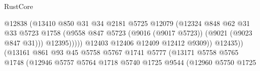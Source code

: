 \begin{lexlean}{RustCore}
\begin{coremodule}
                                                  @12838
                                                  (@13410
                                                    @850
                                                    @31
                                                    @34
                                                    @2181
                                                    @5725
                                                    @12079
                                                    (@12324
                                                      @848
                                                      @62
                                                      @31
                                                      @33
                                                      @5723
                                                      @1758
                                                      (@9558
                                                        @847
                                                        @5723
                                                        (@9016 (@9017 @5723))
                                                        (@9021 (@9023 @847 @31)))
                                                      @12395)))))
                                            @12403
                                            @12406
                                            @12409
                                            @12412
                                            @9309))
                                        @12435))
                                    (@13161
                                      @861
                                      @93
                                      @45
                                      @5758
                                      @5767
                                      @1741
                                      @5777
                                      (@13171
                                        @5758
                                        @5765
                                        @1748
                                        (@12946
                                          @5757
                                          @5764
                                          @1718
                                          @5740
                                          @1725
                                          @9544
                                          (@12960
                                            @5750
                                            @1725

\end{coremodule}
\end{lexlean}
